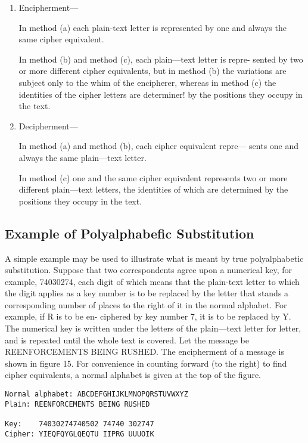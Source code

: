\begin{enumerate}
\item Encipherment—

In method (a) each plain-text letter is represented by one and
always the same cipher equivalent.

In method (b) and method (c), each plain—text letter is repre-
sented by two or more different cipher equivalents, but in
method (b) the variations are subject only to the whim of the
encipherer, whereas in method (c) the identities of the cipher
letters are determiner! by the positions they occupy in the
text.

\item Decipherment—

In method (a) and method (b), each cipher equivalent repre—
sents one and always the same plain—text letter.

In method (c) one and the same cipher equivalent represents
two or more different plain—text letters, the identities of
which are determined by the positions they occupy in the
text.
\end{enumerate}


\subsection{Example of Polyalphabeﬁc Substitution}

\mypara A simple example may be used to illustrate what is meant by true
polyalphabetic substitution. Suppose that two correspondents agree upon
a numerical key, for example, 74030274, each digit of which means
that the plain-text letter to which the digit applies as a key number is to
be replaced by the letter that stands a corresponding number of places to
the right of it in the normal alphabet. For example, if R is to be en-
ciphered by key number 7, it is to be replaced by Y. The numerical key is
written under the letters of the plain—text letter for letter, and is repeated
until the whole text is covered. Let the message be REENFORCEMENTS BEING RUSHED. The encipherment of a message is shown
in ﬁgure 15. For convenience in counting forward (to the right) to ﬁnd
cipher equivalents, a normal alphabet is given at the top of the ﬁgure.

\begin{verbatim}
Normal alphabet: ABCDEFGHIJKLMNOPQRSTUVWXYZ
Plain: REENFORCEMENTS BEING RUSHED

Key:    74030274740502 74740 302747
Cipher: YIEQFQYGLQEQTU IIPRG UUUOIK
\end{verbatim}

